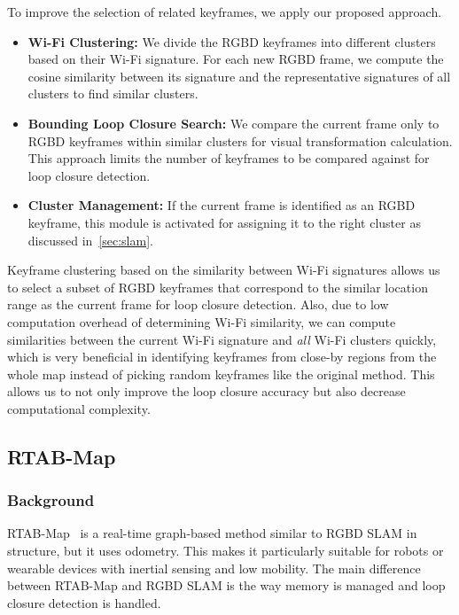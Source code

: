 To improve the selection of related keyframes, we apply our proposed approach.
\begin{itemize}
\item \textbf{Wi-Fi Clustering:} We divide the RGBD keyframes into different clusters based on their Wi-Fi signature. 
For each new RGBD frame, we compute the cosine similarity between its signature and the representative signatures of all clusters to find {similar clusters}. 
\item \textbf{Bounding Loop Closure Search:} We compare the current frame only to RGBD keyframes within {similar clusters} for visual transformation calculation.
This approach limits the number of keyframes to be compared against for loop closure detection. 
\item \textbf{Cluster Management:} If the current frame is identified as an RGBD keyframe, this module is activated for assigning it to the right cluster as discussed in~\ref{sec:slam}.
\end{itemize}
Keyframe clustering based on the similarity between Wi-Fi signatures allows us to select a subset of RGBD keyframes that correspond to the similar location range as the current frame for loop closure detection. Also, due to low computation overhead of determining Wi-Fi similarity, we can compute similarities between the current Wi-Fi signature and {\it all} Wi-Fi clusters quickly, which is very beneficial in identifying keyframes from close-by regions from the whole map instead of picking random keyframes like the original method. This allows us to not only improve the loop closure accuracy but also decrease computational complexity. 

\subsection{RTAB-Map}
\subsubsection{\textbf{Background}}
RTAB-Map~\cite{rtabmap} is a real-time graph-based method similar to RGBD SLAM in structure, but it uses odometry. This makes it particularly suitable for robots or wearable devices with inertial sensing and low mobility. The main difference between RTAB-Map and RGBD SLAM is the way memory is managed and loop closure detection is handled.

